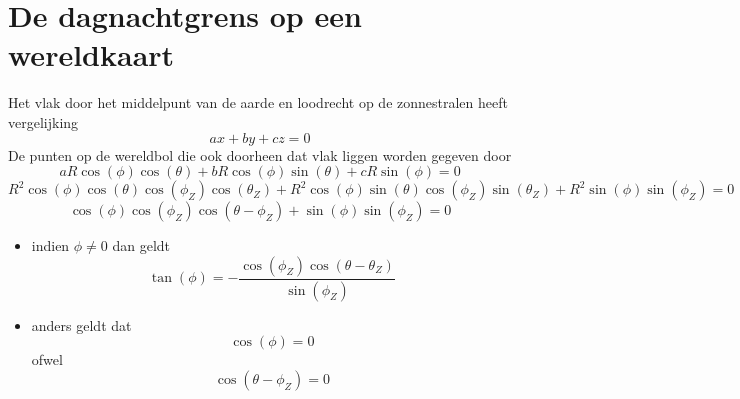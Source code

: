 \documentclass[../main/main.tex]{subfiles}
\begin{document}
\section{De dagnachtgrens op een wereldkaart}
Het vlak door het middelpunt van de aarde en loodrecht op de zonnestralen heeft vergelijking
\begin{equation}
ax+by+cz = 0
\end{equation}
De punten op de wereldbol die ook doorheen dat vlak liggen worden gegeven door
\begin{equation}
aR\cos(\phi)\cos(\theta) + bR\cos(\phi) \sin(\theta) + cR\sin(\phi) = 0
\end{equation}
\begin{equation}
R^2\cos(\phi)\cos(\theta)\cos(\phi_Z)\cos(\theta_Z) + R^2\cos(\phi) \sin(\theta)\cos(\phi_Z)\sin(\theta_Z) + R^2\sin(\phi)\sin(\phi_Z) = 0
\end{equation}
\begin{equation}
\cos(\phi) \cos(\phi_Z) \cos(\theta - \phi_Z) + \sin(\phi) \sin(\phi_Z) = 0
\end{equation}

\begin{itemize}
\item indien $\phi \neq 0$ dan geldt 
\begin{equation}
\tan(\phi) = -\frac{\cos(\phi_Z) \cos(\theta- \theta_Z)}{\sin(\phi_Z)}
\end{equation}

\item anders geldt dat 
\begin{equation}
\cos(\phi) = 0
\end{equation}
ofwel 
\begin{equation}
\cos(\theta - \phi_Z) = 0
\end{equation}

\end{itemize}
\end{document}
